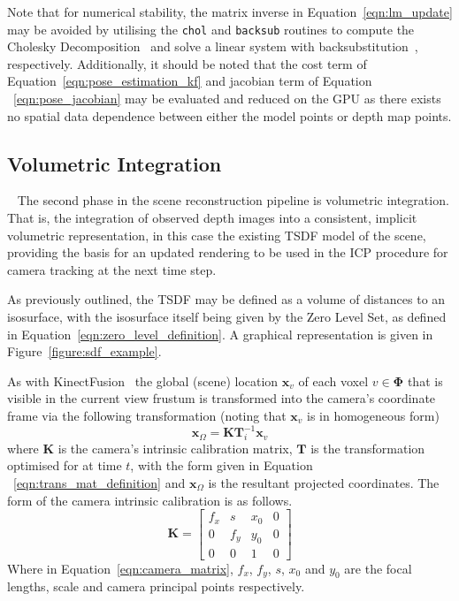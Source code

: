 Note that for numerical stability, the matrix inverse in Equation~\ref{eqn:lm_update} 
may be avoided by utilising the \texttt{chol} and \texttt{backsub} routines to 
compute the Cholesky Decomposition~\cite{NumericalRecipes} and solve a linear system with 
backsubstitution~\cite{ElemLinAlg}, respectively. Additionally, it should be noted that 
the cost term of Equation~\ref{eqn:pose_estimation_kf} and jacobian term of Equation
~\ref{eqn:pose_jacobian} may be evaluated and reduced on the GPU as there exists no spatial 
data dependence between either the model points or depth map points.

\subsection{Volumetric Integration}
~\label{subsec:moseg_static_integration}
The second phase in the scene reconstruction pipeline is volumetric integration.
That is, the integration of observed depth images into a consistent, implicit
volumetric representation, in this case the existing TSDF model of the scene,
providing the basis for an updated rendering to be used in the ICP procedure
for camera tracking at the next time step.

As previously outlined, the TSDF may be defined as a volume of distances to an
isosurface, with the isosurface itself being given by the Zero Level Set, as
defined in Equation~\ref{eqn:zero_level_definition}. A graphical representation
is given in Figure~\ref{figure:sdf_example}.

As with KinectFusion~\cite{Newcombe2011} the global (scene) location
\(\bm{x}_{v}\) of each voxel \(v \in \bm{\Phi}\) that is visible in the
current view frustum is transformed into the camera's coordinate frame via the
following transformation (noting that \(\bm{x}_{v}\) is in homogeneous form)
\begin{equation}
\label{eqn:project_tsdf_to_image}
\bm{x}_{\Omega} = \bm{K}\bm{T}_i^{-1}\bm{x}_{v}
\end{equation}
where \(\bm{K}\) is the camera's intrinsic calibration matrix, \(\bm{T}\) is
the transformation optimised for at time \(t\), with the form given in Equation
~\ref{eqn:trans_mat_definition} and \(\bm{x}_{\Omega}\) is the resultant
projected coordinates. The form of the camera intrinsic calibration is as 
follows.
\begin{equation}
  \label{eqn:camera_matrix}
  \bm{K} = 
  \begin{bmatrix}
    f_{x} & s & x_{0} & 0\\
    0 & f_{y} & y_{0} & 0\\
    0 & 0 & 1 & 0
  \end{bmatrix}
\end{equation}
Where in Equation~\ref{eqn:camera_matrix}, \(f_{x}\), \(f_{y}\), \(s\), \(x_{0}\) 
and \(y_{0}\) are the focal lengths, scale and camera principal points respectively.

